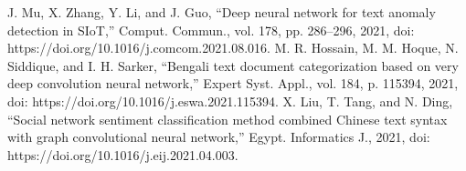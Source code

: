 \documentclass[conference]{IEEEtran}
\begin{document}
\begin{thebibliography}{00}
 J. Mu, X. Zhang, Y. Li, and J. Guo, “Deep neural network for text anomaly detection in SIoT,” Comput. Commun., vol. 178, pp. 286–296, 2021, doi: https://doi.org/10.1016/j.comcom.2021.08.016.
 M. R. Hossain, M. M. Hoque, N. Siddique, and I. H. Sarker, “Bengali text document categorization based on very deep convolution neural network,” Expert Syst. Appl., vol. 184, p. 115394, 2021, doi: https://doi.org/10.1016/j.eswa.2021.115394.
 X. Liu, T. Tang, and N. Ding, “Social network sentiment classification method combined Chinese text syntax with graph convolutional neural network,” Egypt. Informatics J., 2021, doi: https://doi.org/10.1016/j.eij.2021.04.003.
\end{thebibliography}
\end{document}
